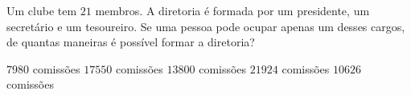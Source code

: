 Um clube tem $21$ membros. A diretoria é formada por um presidente, um secretário e um tesoureiro. Se uma pessoa pode ocupar apenas um desses cargos, de quantas maneiras é possível formar a diretoria?

$7980$ comissões
$17550$ comissões
$13800$ comissões
$21924$ comissões
$10626$ comissões



